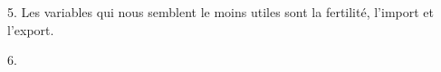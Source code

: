 \documentclass[a4paper, 12pt]{report}
\begin{document}
5. 
Les variables qui nous semblent le moins utiles sont la fertilité, l'import et l'export.

6.
\end{document}

